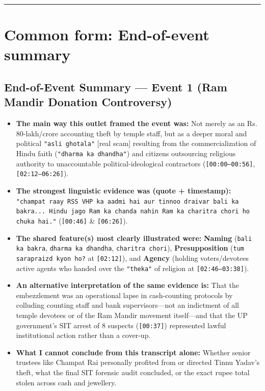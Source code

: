 \documentclass[10pt,a4paper]{article}
\begin{document}
\vspace{4pt}\noindent\rule{\textwidth}{0.4pt}\vspace{4pt}

\section*{Common form: End-of-event summary}

\subsection*{End-of-Event Summary --- Event 1 (Ram Mandir Donation Controversy)}
\begin{itemize}[leftmargin=1.5em, itemsep=3pt, topsep=4pt]
  \item \textbf{The main way this outlet framed the event was:} Not merely as an Rs.\,80-lakh/crore accounting theft by temple staff, but as a deeper moral and political \texttt{"asli ghotala"} [real scam] resulting from the commercialization of Hindu faith (\texttt{"dharma ka dhandha"}) and citizens outsourcing religious authority to unaccountable political-ideological contractors (\texttt{[00:00--00:56]}, \texttt{[02:12--06:26]}).
  \item \textbf{The strongest linguistic evidence was (quote + timestamp):} \texttt{"champat raay RSS VHP ka aadmi hai aur tinnoo draivar bali ka bakra... Hindu jago Ram ka chanda nahin Ram ka charitra chori ho chuka hai."} (\texttt{[00:46]} \& \texttt{[06:26]}).
  \item \textbf{The shared feature(s) most clearly illustrated were:} \textbf{Naming} (\texttt{bali ka bakra}, \texttt{dharma ka dhandha}, \texttt{charitra chori}), \textbf{Presupposition} (\texttt{tum sarapraizd kyon ho?} at \texttt{[02:12]}), and \textbf{Agency} (holding voters/devotees active agents who handed over the \texttt{"theka"} of religion at \texttt{[02:46--03:38]}).
  \item \textbf{An alternative interpretation of the same evidence is:} That the embezzlement was an operational lapse in cash-counting protocols by colluding counting staff and bank supervisors---not an indictment of all temple devotees or of the Ram Mandir movement itself---and that the UP government's SIT arrest of 8 suspects (\texttt{[00:37]}) represented lawful institutional action rather than a cover-up.
  \item \textbf{What I cannot conclude from this transcript alone:} Whether senior trustees like Champat Rai personally profited from or directed Tinnu Yadav's theft, what the final SIT forensic audit concluded, or the exact rupee total stolen across cash and jewellery.
\end{itemize}
\end{document}
